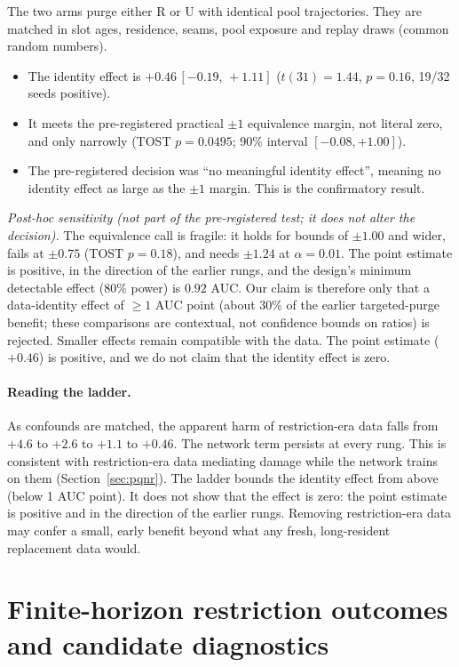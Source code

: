 \documentclass[10pt]{article} %
\newcommand{\ci}[2]{\,[#1,\,#2]}
\begin{document}
The two arms purge either R or U with identical pool trajectories. They are matched in slot ages, residence, seams, pool exposure and replay draws (common random numbers).
\begin{itemize}
\item The identity effect is $+0.46\ci{-0.19}{+1.11}$ ($t(31)=1.44$, $p=0.16$, 19/32 seeds positive).
\item It meets the pre-registered practical $\pm1$ equivalence margin, not literal zero, and only narrowly (TOST $p=0.0495$; 90\% interval $[-0.08,+1.00]$).
\item The pre-registered decision was ``no meaningful identity effect'', meaning no identity effect as large as the $\pm1$ margin. This is the confirmatory result.
\end{itemize}
\emph{Post-hoc sensitivity (not part of the pre-registered test; it does not alter the decision).} The equivalence call is fragile: it holds for bounds of $\pm1.00$ and wider, fails at $\pm0.75$ (TOST $p=0.18$), and needs $\pm1.24$ at $\alpha=0.01$. The point estimate is positive, in the direction of the earlier rungs, and the design's minimum detectable effect (80\% power) is $0.92$ AUC. Our claim is therefore only that a data-identity effect of $\geq1$ AUC point (about 30\% of the earlier targeted-purge benefit; these comparisons are contextual, not confidence bounds on ratios) is rejected. Smaller effects remain compatible with the data. The point estimate ($+0.46$) is positive, and we do not claim that the identity effect is zero.

\paragraph{Reading the ladder.}
As confounds are matched, the apparent harm of restriction-era data falls from $+4.6$ to $+2.6$ to $+1.1$ to $+0.46$. The network term persists at every rung. This is consistent with restriction-era data mediating damage while the network trains on them (Section~\ref{sec:pqnr}). The ladder bounds the identity effect from above (below 1 AUC point). It does not show that the effect is zero: the point estimate is positive and in the direction of the earlier rungs. Removing restriction-era data may confer a small, early benefit beyond what any fresh, long-resident replacement data would.

\section{Finite-horizon restriction outcomes and candidate diagnostics}\label{sec:ponr}
\end{document}
